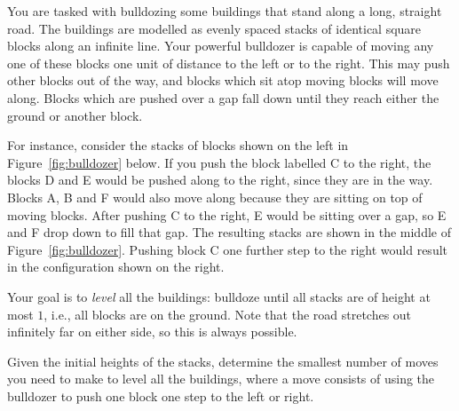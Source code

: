 
You are tasked with bulldozing some buildings that stand along a long,
straight road. The buildings are modelled as evenly spaced stacks of
identical square blocks along an infinite line.  Your powerful
bulldozer is capable of moving any one of these blocks one unit of
distance to the left or to the right. This may push other blocks out of the way, and
blocks which sit atop moving blocks will move along. Blocks which are
pushed over a gap fall down until they reach either the ground or
another block.

For instance, consider the stacks of blocks shown on the left in
Figure~\ref{fig:bulldozer} below.  If you push the block labelled C to
the right, the blocks D and E would be pushed along to the
right, since they are in the way. Blocks A, B and F would
also move along because they are sitting on top of moving blocks. After
pushing C to the right, E would be sitting over a gap, so
E and F drop down to fill that gap. The resulting stacks
are shown in the middle of Figure~\ref{fig:bulldozer}.  Pushing block
C one further step to the right would result in the configuration
shown on the right.

Your goal is to \emph{level} all the buildings: bulldoze until all
stacks are of height at most $1$, i.e., all blocks are on the ground.
Note that the road stretches out infinitely far on either side, so
this is always possible.

Given the initial heights of the stacks, determine the smallest number
of moves you need to make to level all the buildings, where a move
consists of using the bulldozer to push one block one step to the left
or right.

